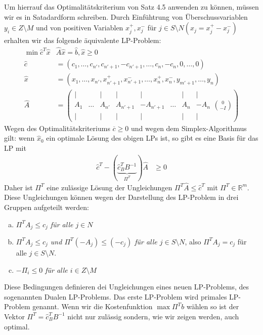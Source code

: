 Um hierrauf das Optimalitätskriterium von Satz 4.5 anwenden zu können, müssen wir es in Satadardform schreiben. Durch Einfühtrung von Überschussvariablen $y_i \in Z \setminus M $ und von positiven Variablen $x^+_j, x^-_j$ für $j \in S \setminus N ( x_j = x^+_j - x^-_j)$ erhalten wir das folgende äquivalente LP-Problem:
\begin{align*}
\min \hat{c}^T\hat{x} & \hat{A}\hat{x} = \hat{b}, \hat{x} \geq 0 \\
\hat{c} &= ( c_1, \dotsc, c_{n'}, c_{n'+1}, -c_{n'+1} , \dotsc , c_n, -c_n, 0, \dotsc ,0) \\
\hat{x} &= (x_1, \dotsc , x_{n'}, x^+_{n'+1}, x^-_{n'+1}, \dotsc , x^+_n, x^-_n, y_{m'+1}, \dotsc, y_n )\\
\hat{A} &= \left ( \begin{matrix}
| &  & | & | & | & & | & |  \\
A_1 & \hdots & A_{n'} & A_{n'+1} & -A_{n'+1} & \hdots & A_n & -A_n \\
| &  & | & | & | & & | & | 
\end{matrix} \binom{0}{-I} \right )
\end{align*}
Wegen des Optimalitätskriteriums $\overline{c} \geq 0$ und wegen dem Simplex-Algorithmus gilt:
wenn $\hat{x}_0$ ein optimale Lösung des obigen LPs ist, so gibt es eine Basis für das LP mit
\begin{align*}
\hat{c}^T - (\underbrace{\hat{c}_B^T B^{-1}}_{\Pi^T} )\hat{A} &\geq 0
\end{align*}
Daher ist $\Pi^T$ eine zulässige Lösung der Ungleichungen $\Pi^T \hat{A} \leq \hat{c}^T$ mit $\Pi^T \in \mathbb R^m$.
Diese Ungleichungen können wegen der Darstellung des LP-Problem in drei Gruppen aufgeteilt werden:
\begin{enumerate}[(a)]
\item \emph{$\Pi^TA_j \leq c_j$ für alle $j \in N$}
\item \emph{$\Pi^TA_j \leq c_j$ und $\Pi^T(-A_j) \leq (-c_j)$ für alle $j \in S\setminus N$}, also $\Pi^TA_j = c_j$ für alle $j\in S\setminus N$.
\item \emph{$-\Pi_i \leq 0$ für alle $i \in Z\setminus M$}
\end{enumerate}
Diese Bedingungen definieren dei Ungleichungen eines neuen LP-Problems, des sogenannten Dualen LP-Problems.
Das erste LP-Problem wird primales LP-Problem genannt.
Wenn wir die Kostenfunktion $\max \Pi^T b$ wählen so ist der Vektor $\Pi^T = \hat{c}^T_B B^{-1}$ nicht nur zulässig
sondern, wie wir zeigen werden, auch optimal.

